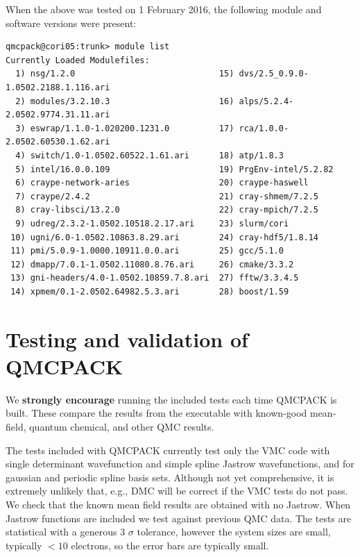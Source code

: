 When the above was tested on 1 February 2016, the following module and
software versions were present:

\begin{verbatim}
qmcpack@cori05:trunk> module list
Currently Loaded Modulefiles:
  1) nsg/1.2.0                             15) dvs/2.5_0.9.0-1.0502.2188.1.116.ari            
  2) modules/3.2.10.3                      16) alps/5.2.4-2.0502.9774.31.11.ari               
  3) eswrap/1.1.0-1.020200.1231.0          17) rca/1.0.0-2.0502.60530.1.62.ari                
  4) switch/1.0-1.0502.60522.1.61.ari      18) atp/1.8.3                                      
  5) intel/16.0.0.109                      19) PrgEnv-intel/5.2.82                            
  6) craype-network-aries                  20) craype-haswell                                 
  7) craype/2.4.2                          21) cray-shmem/7.2.5                               
  8) cray-libsci/13.2.0                    22) cray-mpich/7.2.5                               
  9) udreg/2.3.2-1.0502.10518.2.17.ari     23) slurm/cori                                     
 10) ugni/6.0-1.0502.10863.8.29.ari        24) cray-hdf5/1.8.14                               
 11) pmi/5.0.9-1.0000.10911.0.0.ari        25) gcc/5.1.0                                      
 12) dmapp/7.0.1-1.0502.11080.8.76.ari     26) cmake/3.3.2                                    
 13) gni-headers/4.0-1.0502.10859.7.8.ari  27) fftw/3.3.4.5                                   
 14) xpmem/0.1-2.0502.64982.5.3.ari        28) boost/1.59                                     
\end{verbatim}

\section{Testing and validation of QMCPACK}
\label{sec:testing}
We \textbf{strongly encourage} running the included tests each time
QMCPACK is built. These compare the results from the executable with
known-good mean-field, quantum chemical, and other QMC results. 

The tests included with QMCPACK currently test only the VMC code with
single determinant wavefunction and simple spline Jastrow
wavefunctions, and for gaussian and periodic spline basis
sets. Although not yet comprehensive, it is extremely unlikely that,
e.g., DMC will be correct if the VMC tests do not pass.  We check that the known mean
field results are obtained with no Jastrow. When Jastrow functions are
included we test against previous QMC data. The tests are statistical
with a generous 3 $\sigma$ tolerance, however the system sizes are
small, typically $<10$ electrons, so the error bars are typically
small.

